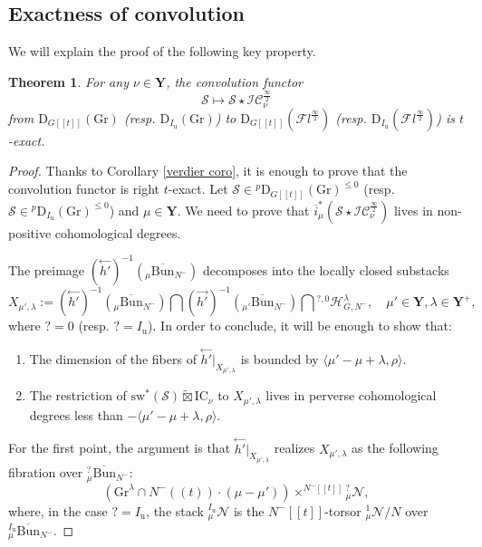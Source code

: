 \documentclass[11pt]{amsart}
\theoremstyle{plain}
\newtheorem{thm}{Theorem}[section]
\theoremstyle{remark}
\numberwithin{equation}{section}
\begin{document}
	\subsection{Exactness of convolution}
	We will explain the proof of the following key property.
	\begin{thm}{{\cite[Theorem 5.2.2]{ABBGM}}}\label{thm exact}
		For any $\nu\in\mathbf{Y}$, the convolution functor 
		$$\mathcal{S}\mapsto \mathcal{S}\star\mathcal{IC}^{\frac{\infty}{2}}_\nu $$
		from $\mathrm{D}_{G[[t]]}(\mathrm{Gr})$ (resp.   $\mathrm{D}_{I_\mathrm{u}}(\mathrm{Gr})$) to $\mathrm{D}_{G[[t]]}(\mathcal{F}l^{\frac{\infty}{2}})$ (resp. $\mathrm{D}_{I_\mathrm{u}}(\mathcal{F}l^{\frac{\infty}{2}})$) is $t$-exact.
	\end{thm}
	\begin{proof}
		Thanks to Corollary \ref{verdier coro}, it is enough to prove that the convolution functor is right $t$-exact. Let $\mathcal{S}\in {^p\mathrm{D}_{G[[t]]}(\mathrm{Gr})^{\leq0}}$ (resp. $\mathcal{S}\in {^p\mathrm{D}_{I_\mathrm{u}}(\mathrm{Gr})^{\leq0}}$) and $\mu\in \mathbf{Y}$. We need to prove that $\overline{i}_\mu^*(\mathcal{S}\star \mathcal{IC}^{\frac{\infty}{2}}_\nu ) $ lives in non-positive cohomological degrees. 
		
		The preimage $(\overset{\leftarrow}{h'})^{-1}({_\mu\overline{\mathrm{Bun}}_{N^-}})$ decomposes into the locally closed substacks
		$$X_{\mu',\lambda}:=(\overset{\leftarrow}{h'})^{-1}({_\mu\overline{\mathrm{Bun}}_{N^-}})\bigcap (\overset{\rightarrow}{h'})^{-1}({_{\mu'}\overline{\mathrm{Bun}}_{N^-}})\bigcap {^{?,0}\mathcal{H}^\lambda_{G,N^-}},\quad\mu'\in\mathbf{Y},\lambda\in\mathbf{Y}^+, $$
		where $?=0$ (resp. $?=I_\mathrm{u}$). In order to conclude, it will be enough to show that:
		\begin{enumerate}
			\item The dimension of the fibers of $\overset{\leftarrow}{h'}|_{X_{\mu',\lambda}}$ is bounded by $\langle \mu'-\mu+\lambda,\rho\rangle$. 
			\item The restriction of $\mathrm{sw}^*(\mathcal{S})\widetilde{\boxtimes}\mathrm{IC}_\nu$ to $X_{\mu',\lambda}$ lives in perverse cohomological degrees less than $ -\langle \mu'-\mu+\lambda,\rho\rangle$.
		\end{enumerate}
		For the first point, the argument is that $\overset{\leftarrow}{h'}|_{X_{\mu',\lambda}}$ realizes $X_{\mu',\lambda}$ as the following fibration over ${^?_\mu\overline{\mathrm{Bun}}_{N^-}}$:  
		$$(\mathrm{Gr}^{\lambda}\cap N^-((t))\cdot(\mu-\mu'))\times^{N^-[[t]]} {^?_{\mu}\mathcal{N}},$$
		where, in the case $?=I_\mathrm{u}$, the stack ${^{I_\mathrm{u}}_{\mu}\mathcal{N}}$ is the $N^-[[t]]$-torsor ${^{1}_{\mu}\mathcal{N}}/N$ over ${^{I_\mathrm{u}}_\mu\overline{\mathrm{Bun}}_{N^-}}$.
		

\end{proof}
\end{document}
